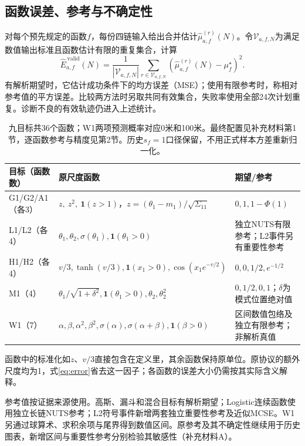 \documentclass[UTF8,fontset=fandol,zihao=-4]{ctexart}
\newcommand{\ind}{\mathbf{1}}
\begin{document}
\subsection{函数误差、参考与不确定性}
对每个预先规定的函数$f$，每份四链输入给出合并估计$\widehat\mu_{a,f}^{(r)}(N)$。令$\mathcal V_{a,f,N}$为满足数值输出标准且函数估计有限的重复集合，计算
\begin{equation}\label{eq:error}
\widehat E^{\,\mathrm{valid}}_{a,f}(N)=
\frac1{|\mathcal V_{a,f,N}|}\sum_{r\in\mathcal V_{a,f,N}}
(\widehat\mu_{a,f}^{(r)}(N)-\mu_f^\star)^2.
\end{equation}
有解析期望时，它估计成功条件下的均方误差（MSE）；使用有限参考时，称相对参考值的平方误差。比较两方法时另取共同有效集合，失败率使用全部24次计划重复。诊断不良的有效轨迹仍进入上述统计。
\begin{table}[htbp]\centering\small
\begin{tabular}{>{\raggedright\arraybackslash}p{.15\linewidth}>{\raggedright\arraybackslash}p{.40\linewidth}>{\raggedright\arraybackslash}p{.33\linewidth}}\toprule
目标（函数数） & 原尺度函数 & 期望/参考\\\midrule
G1/G2/A1（各3） & $z,\ z^2,\ \ind(z>1)$，$z=(\theta_1-m_1)/\sqrt{\Sigma_{11}}$ & $0,1,1-\Phi(1)$\\
L1/L2（各4） & $\theta_1,\theta_2,\sigma(\theta_1),\ind(\theta_1>0)$ & 独立NUTS有限参考；L2事件另有重要性参考\\
H1/H2（各4） & $v/3,\tanh(v/3),\ind(x_1>0),\cos(x_1e^{-v/2})$ & $0,0,1/2,e^{-1/2}$\\
M1（4） & $\theta_1/\sqrt{1+\delta^2},\ind(\theta_1>0),\theta_2,\theta_2^2$ & $0,1/2,0,1$；$\delta$为模式位置绝对值\\
W1（7） & $\alpha,\beta,\alpha^2,\beta^2,\sigma(\alpha),\sigma(\alpha+\beta),\ind(\beta>0)$ & 区间数值包络及独立有限参考；非解析真值\\\bottomrule
\end{tabular}
\caption{九目标共36个函数；W1两项预测概率对应0米和100米。最终配置见补充材料第1节，逐函数参考与精度见第2节。历史$s_f=1$口径保留，不用正式样本方差重新归一化。}
\label{tab:functions}
\end{table}

函数中的标准化如$z$、$v/3$直接包含在定义里，其余函数保持原单位。原协议的额外尺度均为1，式\eqref{eq:error}省去这一因子；各函数的误差大小仍需按其实际含义解释。

参考值按证据来源使用。高斯、漏斗和混合目标有解析期望；Logistic连续函数使用独立长链NUTS参考；L2符号事件新增两套独立重要性参考及近似MCSE。W1另通过球算术、求积余项与尾界得到数值区间。原参考及其不确定性继续用于历史图表，新增区间与重要性参考分别检验其敏感性（补充材料A）。
\end{document}
